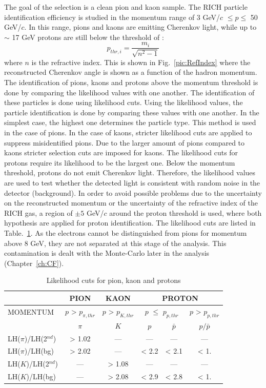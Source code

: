 The goal of the selection is a clean pion and kaon sample. The RICH particle identification efficiency is studied in the momentum range of 3 GeV/$c$ $ \leq p \leq $ 50 GeV/$c$. In this range, pions and kaons are emitting Cherenkov light, while up to $\sim$ 17 GeV protons are still below the threshold of :
%
\begin{equation}
  p_{thr,i} = \frac{m_i}{ \sqrt{n^{2}-1} }
\end{equation}
%
where $n$ is the refractive index. This is shown in Fig.~\ref{pic:RefIndex} where the reconstructed Cherenkov angle is shown as a function of the hadron momentum. The identification of pions, kaons and protons above the momentum threshold is done by comparing the likelihood values with one another. The identification of these particles is done using likelihood cuts. Using the likelihood values, the particle identification is done by comparing these values with one another. In the simplest case, the highest one determines the particle type. This method is used in the case of pions. In the case of kaons, stricter likelihood cuts are applied to suppress misidentified pions. Due to the larger amount of pions compared to kaons stricter selection cuts are imposed for kaons. The likelihood cuts for protons require its likelihood to be the largest one.  Below the momentum threshold, protons do not emit Cherenkov light. Therefore, the likelihood values are used to test whether the detected light is consistent with random noise in the detector (background). In order to avoid possible problems due to the uncertainty on the reconstructed momentum or the uncertainty of the refractive index of the RICH gas, a region of $\pm 5$ GeV/$c$ around the proton threshold is used, where both hypothesis are applied for proton identification. The likelihood cuts are listed in Table.~\ref{tab:LHcut}. As the electrons cannot be distinguished from pions for momentum above $8$ GeV, they are not separated at this stage of the analysis. This contamination is dealt with the Monte-Carlo later in the analysis (Chapter~\ref{ch:CF}).

\begin{table}[!h]
  \caption{Likelihood cuts for pion, kaon and protons}
  \label{tab:LHcut}
  \centering
  \begin{tabular}{lccccc}
    \hline
     & PION & KAON & \multicolumn{3}{c}{PROTON} \\
    \hline
    MOMENTUM & $p$ > $p_{\pi,thr}$ & $p$ > $p_{K,thr}$ & \multicolumn{2}{c}{$p$ $\leq$ $p_{p,thr}$} & $p$ > $p_{p,thr}$ \\
     & $\pi$ & $K$ & $p$ & $\bar{p}$ & $p/\bar{p}$ \\
    LH($\pi$)/LH(2$^{nd}$) & > 1.02 & --- & --- & --- & --- \\
    LH($\pi$)/LH(bg) & > 2.02 & --- & < 2.2 & < 2.1 & < 1.\\
    LH($K$)/LH(2$^{nd}$) & --- & > 1.08 & --- & --- & --- \\
    LH($K$)/LH(bg) & --- & > 2.08 & < 2.9 & < 2.8 & < 1. \\
    \hline
  \end{tabular}
\end{table}

